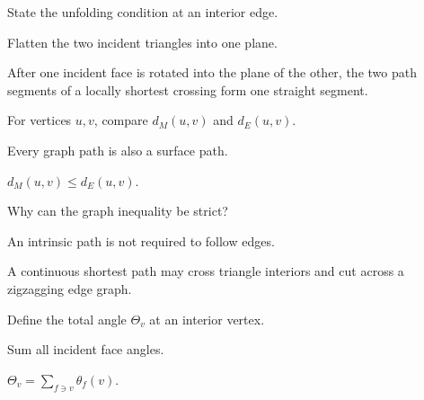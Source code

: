 \begin{exercise}\label{exr:vii38-04}
State the unfolding condition at an interior edge.
\end{exercise}

\begin{hint}
Flatten the two incident triangles into one plane.
\end{hint}

\begin{solution}
After one incident face is rotated into the plane of the other, the two path segments of a locally shortest crossing form one straight segment.
\end{solution}

\begin{exercise}\label{exr:vii38-05}
For vertices \(u,v\), compare \(d_M(u,v)\) and \(d_E(u,v)\).
\end{exercise}

\begin{hint}
Every graph path is also a surface path.
\end{hint}

\begin{solution}
\(d_M(u,v)\le d_E(u,v)\).
\end{solution}

\begin{exercise}\label{exr:vii38-06}
Why can the graph inequality be strict?
\end{exercise}

\begin{hint}
An intrinsic path is not required to follow edges.
\end{hint}

\begin{solution}
A continuous shortest path may cross triangle interiors and cut across a zigzagging edge graph.
\end{solution}

\begin{exercise}\label{exr:vii38-07}
Define the total angle \(\Theta_v\) at an interior vertex.
\end{exercise}

\begin{hint}
Sum all incident face angles.
\end{hint}

\begin{solution}
\(\Theta_v=\sum_{f\ni v}\theta_f(v)\).
\end{solution}

